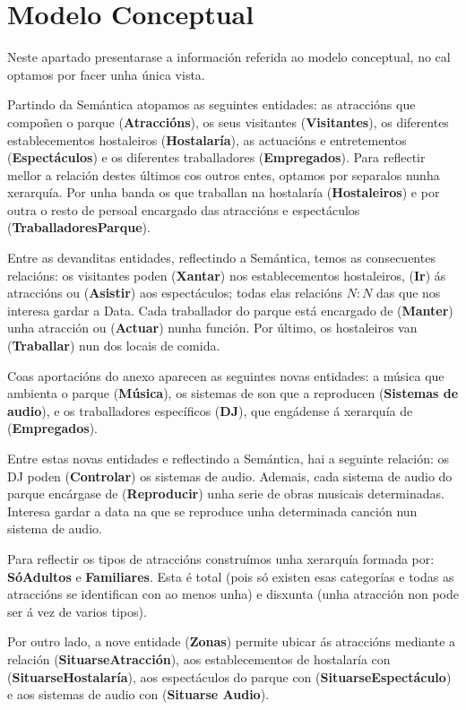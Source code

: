 \documentclass[12pt,a4paper]{book}
\theoremstyle{definition}
\theoremstyle{break}
\begin{document}
	
	\chapter{Modelo Conceptual}
	Neste apartado presentarase a información referida ao modelo conceptual, no cal optamos por facer unha única vista.
	
	Partindo da Semántica atopamos as seguintes entidades: as atraccións que compoñen o parque (\textbf{Atraccións}), os seus visitantes (\textbf{Visitantes}), os diferentes establecementos hostaleiros (\textbf{Hostalaría}), as actuacións e entretementos (\textbf{Espectáculos}) e os diferentes traballadores (\textbf{Empregados}). Para reflectir mellor a relación destes últimos cos outros entes, optamos por separalos nunha xerarquía. Por unha banda os que traballan na hostalaría (\textbf{Hostaleiros}) e por outra o resto de persoal encargado das atraccións e espectáculos (\textbf{TraballadoresParque}).
	
	Entre as devanditas entidades, reflectindo a Semántica, temos as consecuentes relacións: os visitantes poden (\textbf{Xantar}) nos establecementos hostaleiros, (\textbf{Ir}) ás atraccións ou (\textbf{Asistir}) aos espectáculos; todas elas relacións $N:N$ das que nos interesa gardar a Data. Cada traballador do parque está encargado de (\textbf{Manter}) unha atracción ou (\textbf{Actuar}) nunha función. Por último, os hostaleiros van (\textbf{Traballar}) nun dos locais de comida.
	
	Coas aportacións do anexo aparecen as seguintes novas entidades: a música que ambienta o
	parque (\textbf{Música}), os sistemas de son que a reproducen (\textbf{Sistemas de audio}),
	e os traballadores específicos (\textbf{DJ}), que engádense á xerarquía de (\textbf{Empregados}).
	
	Entre estas novas entidades e reflectindo a Semántica, hai a seguinte relación: os DJ poden (\textbf{Controlar}) os sistemas de audio. Ademais, cada sistema
	de audio do parque encárgase de (\textbf{Reproducir}) unha serie de obras musicais determinadas. Interesa gardar a data na que se reproduce unha determinada
	canción nun sistema de audio.
	
	Para reflectir os tipos de atraccións construímos unha xerarquía formada por: \textbf{SóAdultos} e
	\textbf{Familiares}. Esta é total (pois só existen esas categorías e todas as atraccións se
	identifican con ao menos unha) e disxunta (unha atracción non pode ser á vez de varios
	tipos).
	
	Por outro lado, a nove entidade (\textbf{Zonas}) permite ubicar ás atraccións mediante a relación (\textbf{SituarseAtracción}), aos establecementos de hostalaría con (\textbf{SituarseHostalaría}), aos espectáculos do parque con (\textbf{SituarseEspectáculo}) e aos sistemas de audio con (\textbf{Situarse Audio}).
	
\end{document}
